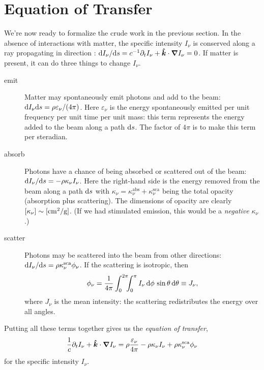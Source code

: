 \section{Equation of Transfer}

We're now ready to formalize the crude work in the previous section.
In the absence of interactions with matter, the specific intensity $I_{\nu}$ is conserved along a ray propagating in direction \unitk: $\mathrm{d} I_{\nu}/\mathrm{d} s = c^{-1}\partial_{t}I_{\nu} + \boldsymbol{\hat{k}}\cdot\boldsymbol{\nabla} I_{\nu} = 0$. If matter is present, it can do three things to change $I_{\nu}$.
\begin{description}
\item[emit] Matter may spontaneously emit photons and add to the beam: $\mathrm{d} I_{\nu}\mathrm{d} s = \rho\varepsilon_{\nu}/(4\pi)$. Here $\varepsilon_{\nu}$ is the energy spontaneously emitted per unit frequency per unit time per unit mass: this term represents the energy added to the beam along a path $\mathrm{d} s$.  The factor of $4\pi$ is to make this term per steradian.

\item[absorb] Photons have a chance of being absorbed or scattered out of the beam: $\mathrm{d} I_{\nu}/\mathrm{d} s = -\rho\kappa_{\nu}I_{\nu}$. Here the right-hand side is the energy removed from the beam along a path $\mathrm{d} s$ with $\kappa_{\nu} = \kappa_{\nu}^{\mathrm{abs}} + \kappa_{\nu}^{\mathrm{sca}}$ being the total opacity (absorption plus scattering). The dimensions of opacity are clearly $[\kappa_{\nu}] \sim [\mathrm{c}\mathrm{m}^{2}/\mathrm{g}]$. (If we had stimulated emission, this would be a \emph{negative} $\kappa_{\nu}$.)

\item[scatter] Photons may be scattered into the beam from other directions: $\mathrm{d} I_{\nu}/\mathrm{d} s = \rho\kappa_{\nu}^{\mathrm{sca}}\phi_{\nu}$. If the scattering is isotropic, then
\begin{equation}\label{e.isosca}
\phi_{\nu} = \frac{1}{4\pi}\int_{0}^{2\pi}\!\!\!\int_{0}^{\pi} I_{\nu}\,\mathrm{d}\phi\,\sin\theta\,\mathrm{d}\theta \equiv J_{\nu},
\end{equation}
where $J_{\nu}$ is the mean intensity: the scattering redistributes the energy over all angles.
\end{description}
Putting all these terms together gives us the \emph{equation of transfer},
\begin{equation}\label{e.transfer}
\frac{1}{c}\partial_{t}I_{\nu} + \boldsymbol{\hat{k}}\cdot\boldsymbol{\nabla} I_{\nu} = \rho \frac{\varepsilon_{\nu}}{4\pi} - \rho\kappa_{\nu} I_{\nu} + \rho\kappa_{\nu}^{\mathrm{sca}}\phi_{\nu}
\end{equation}
for the specific intensity $I_{\nu}$.

